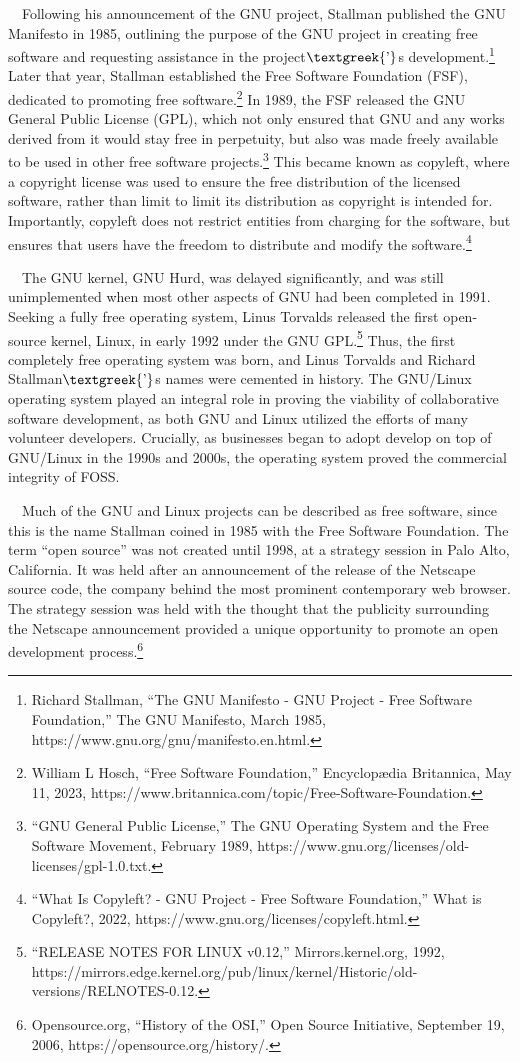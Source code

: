 \documentclass{article}
\begin{document}
\ \ Following his announcement of the GNU project, Stallman published the GNU Manifesto in 1985, outlining the purpose
of the GNU project in creating free software and requesting assistance in the project$\text{\textgreek{’}}$s
development.\footnote{Richard Stallman, “The GNU Manifesto - GNU Project - Free Software Foundation,” The GNU
Manifesto, March 1985, https://www.gnu.org/gnu/manifesto.en.html.} Later that year, Stallman established the Free
Software Foundation (FSF), dedicated to promoting free software.\footnote{William L Hosch, “Free Software Foundation,”
Encyclopædia Britannica, May 11, 2023, https://www.britannica.com/topic/Free-Software-Foundation.} In 1989, the FSF
released the GNU General Public License (GPL), which not only ensured that GNU and any works derived from it would stay
free in perpetuity, but also was made freely available to be used in other free software projects.\footnote{“GNU
General Public License,” The GNU Operating System and the Free Software Movement, February 1989,
https://www.gnu.org/licenses/old-licenses/gpl-1.0.txt.} This became known as copyleft, where a copyright license was
used to ensure the free distribution of the licensed software, rather than limit to limit its distribution as copyright
is intended for. Importantly, copyleft does not restrict entities from charging for the software, but ensures that
users have the freedom to distribute and modify the software.\footnote{“What Is Copyleft? - GNU Project - Free Software
Foundation,” What is Copyleft?, 2022, https://www.gnu.org/licenses/copyleft.html.}

\ \ The GNU kernel, GNU Hurd, was delayed significantly, and was still unimplemented when most other aspects of GNU had
been completed in 1991. Seeking a fully free operating system, Linus Torvalds released the first open-source kernel,
Linux, in early 1992 under the GNU GPL.\footnote{“RELEASE NOTES FOR LINUX v0.12,” Mirrors.kernel.org, 1992,
https://mirrors.edge.kernel.org/pub/linux/kernel/Historic/old-versions/RELNOTES-0.12.} Thus, the first completely free
operating system was born, and Linus Torvalds and Richard Stallman$\text{\textgreek{’}}$s names were cemented in
history. The GNU/Linux operating system played an integral role in proving the viability of collaborative software
development, as both GNU and Linux utilized the efforts of many volunteer developers. Crucially, as businesses began to
adopt develop on top of GNU/Linux in the 1990s and 2000s, the operating system proved the commercial integrity of FOSS.

\ \ Much of the GNU and Linux projects can be described as free software, since this is the name Stallman coined in 1985
with the Free Software Foundation. The term “open source” was not created until 1998, at a strategy session in Palo
Alto, California. It was held after an announcement of the release of the Netscape source code, the company behind the
most prominent contemporary web browser. The strategy session was held with the thought that the publicity surrounding
the Netscape announcement provided a unique opportunity to promote an open development
process.\footnote{Opensource.org, “History of the OSI,” Open Source Initiative, September 19, 2006,
https://opensource.org/history/.}
\end{document}
